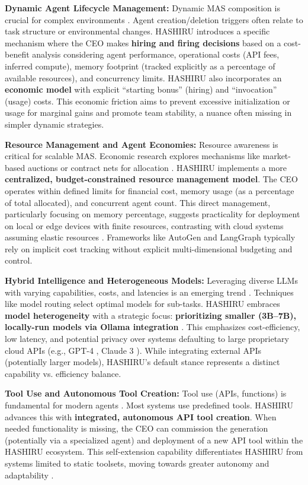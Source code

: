 \documentclass[conference]{IEEEtran}
\begin{document}
\textbf{Dynamic Agent Lifecycle Management:}
Dynamic MAS composition is crucial for complex environments \cite{valckenaers2005trends}. Agent creation/deletion triggers often relate to task structure or environmental changes. HASHIRU introduces a specific mechanism where the CEO makes \textbf{hiring and firing decisions} based on a cost-benefit analysis considering agent performance, operational costs (API fees, inferred compute), memory footprint (tracked explicitly as a percentage of available resources), and concurrency limits. HASHIRU also incorporates an \textbf{economic model} with explicit ``starting bonus'' (hiring) and ``invocation'' (usage) costs. This economic friction aims to prevent excessive initialization or usage for marginal gains and promote team stability, a nuance often missing in simpler dynamic strategies.

\textbf{Resource Management and Agent Economies:}
Resource awareness is critical for scalable MAS. Economic research explores mechanisms like market-based auctions or contract nets for allocation \cite{clearwater1996market}. HASHIRU implements a more \textbf{centralized, budget-constrained resource management model}. The CEO operates within defined limits for financial cost, memory usage (as a percentage of total allocated), and concurrent agent count. This direct management, particularly focusing on memory percentage, suggests practicality for deployment on local or edge devices with finite resources, contrasting with cloud systems assuming elastic resources \cite{park2023generative}. Frameworks like AutoGen \cite{wu2023autogen} and LangGraph \cite{langgraph} typically rely on implicit cost tracking without explicit multi-dimensional budgeting and control.

\textbf{Hybrid Intelligence and Heterogeneous Models:}
Leveraging diverse LLMs with varying capabilities, costs, and latencies is an emerging trend \cite{zhou2023agents}. Techniques like model routing select optimal models for sub-tasks. HASHIRU embraces \textbf{model heterogeneity} with a strategic focus: \textbf{prioritizing smaller (3B--7B), locally-run models via Ollama integration} \cite{ollama}. This emphasizes cost-efficiency, low latency, and potential privacy over systems defaulting to large proprietary cloud APIs (e.g., GPT-4 \cite{openai2023gpt4}, Claude 3 \cite{anthropic2024claude}). While integrating external APIs (potentially larger models), HASHIRU's default stance represents a distinct capability vs. efficiency balance.

\textbf{Tool Use and Autonomous Tool Creation:}
Tool use (APIs, functions) is fundamental for modern agents \cite{yao2022react, openai_func_calling}. Most systems use predefined tools. HASHIRU advances this with \textbf{integrated, autonomous API tool creation}. When needed functionality is missing, the CEO can commission the generation (potentially via a specialized agent) and deployment of a new API tool within the HASHIRU ecosystem. This self-extension capability differentiates HASHIRU from systems limited to static toolsets, moving towards greater autonomy and adaptability \cite{wang2023voyager, park2023generative}.
\end{document}
